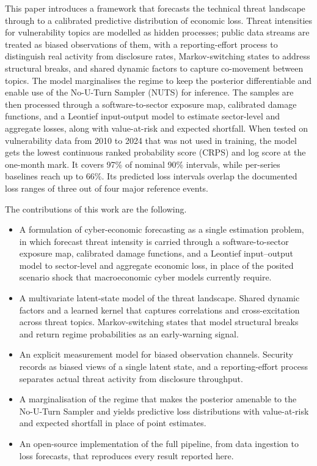 \documentclass[review]{elsarticle}
\begin{document}
This paper introduces a framework that forecasts the technical threat landscape through to a calibrated predictive distribution of economic loss. Threat intensities for vulnerability topics are modelled as hidden processes; public data streams are treated as biased observations of them, with a reporting-effort process to distinguish real activity from disclosure rates, Markov-switching states to address structural breaks, and shared dynamic factors to capture co-movement between topics. The model marginalises the regime to keep the posterior differentiable and enable use of the No-U-Turn Sampler (NUTS) for inference. The samples are then processed through a software-to-sector exposure map, calibrated damage functions, and a Leontief input-output model to estimate sector-level and aggregate losses, along with value-at-risk and expected shortfall. When tested on vulnerability data from 2010 to 2024 that was not used in training, the model gets the lowest continuous ranked probability score (CRPS) and log score at the one-month mark. It covers 97\% of nominal 90\% intervals, while per-series baselines reach up to 66\%. Its predicted loss intervals overlap the documented loss ranges of three out of four major reference events.

The contributions of this work are the following.
\begin{itemize}
\item A formulation of cyber-economic forecasting as a single estimation problem, in which forecast threat intensity is carried through a software-to-sector exposure map, calibrated damage functions, and a Leontief input--output model to sector-level and aggregate economic loss, in place of the posited scenario shock that macroeconomic cyber models currently require.

\item A multivariate latent-state model of the threat landscape. Shared dynamic factors and a learned kernel that captures correlations and cross-excitation across threat topics. Markov-switching states that model structural breaks and return regime probabilities as an early-warning signal.

\item An explicit measurement model for biased observation channels. Security records as biased views of a single latent state, and a reporting-effort process separates actual threat activity from disclosure throughput.

\item A marginalisation of the regime that makes the posterior amenable to the No-U-Turn Sampler and yields predictive loss distributions with value-at-risk and expected shortfall in place of point estimates.

\item An open-source implementation of the full pipeline, from data ingestion to loss forecasts, that reproduces every result reported here.
\end{itemize}
\end{document}
